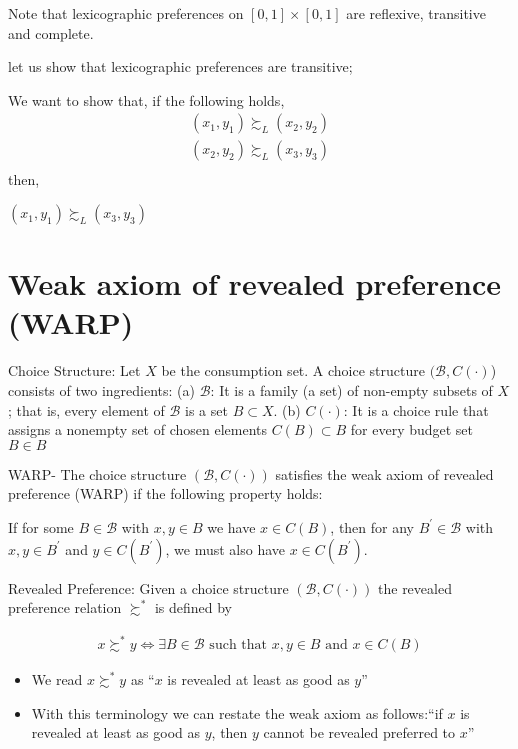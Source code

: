 \documentclass[12pt,a4paper,fleqn]{article}
\begin{document}
Note that lexicographic preferences on \([0,1] \times [0,1]\)  are reflexive, transitive and complete.

let us show that lexicographic preferences are transitive;

We want to show that, if the following holds,
 \begin{align*}
    (x_{1},y_{1}) \succsim_{L} (x_{2},y_{2}) \\
    (x_{2},y_{2}) \succsim_{L} (x_{3},y_{3})\\
\end{align*}
then,

\((x_{1},y_{1}) \succsim_{L} (x_{3},y_{3})\)  

 \section{Weak axiom of revealed preference (WARP)} 

 Choice Structure: Let \(X\) be the consumption set. A choice structure \((\mathcal{B}, C(\cdot)\)) consists of two ingredients:
(a) \(\mathcal{B}\): It is a family (a set) of non-empty subsets of \(X\); that is, every element of \(\mathcal{B}\) is a set \(B \subset X\).
(b) \(C(\cdot)\): It is a choice rule that assigns a nonempty set of chosen elements \(C(B) \subset B\) for every budget set \(B \in B\)

 WARP- The choice structure \((\mathcal{B}, C(\cdot))\) satisfies the weak axiom of revealed preference (WARP) if the following property holds:

If for some \(B \in \mathcal{B}\) with \(x, y \in B\) we have \(x \in C(B)\), then for any \(B^{\prime} \in \mathcal{B}\) with \(x, y \in B^{\prime}\) and \(y \in C\left(B^{\prime}\right)\), we must also have \(x \in C\left(B^{\prime}\right)\).

Revealed Preference: Given a choice structure \(\left( \mathcal{B},C(\cdot) \right) \) the revealed preference relation \(\succsim^*\) is defined by   

\begin{align*}
x \succsim^* y \Leftrightarrow \exists B \in \mathcal{B} \text { such that } x, y \in B \text { and } x \in C(B)
\end{align*}

\begin{itemize}
  \item We read \(x \succsim^* y\) as ``\(x\) is revealed at least as good as \(y\)''
  \item With this terminology we can restate the weak axiom as follows:``if \(x\) is revealed at least as good as \(y\), then \(y\) cannot be revealed preferred to \(x\)''
\end{itemize}
\end{document}
